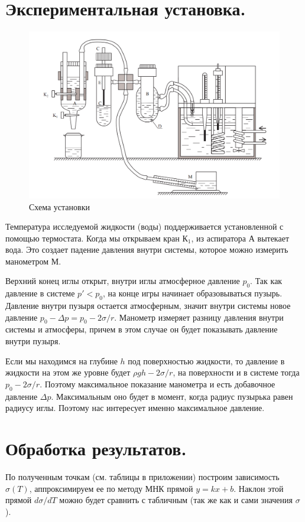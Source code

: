 \documentclass[a4paper,12pt]{report}
\begin{document}
\begin{multicols}{2}
        \section{Экспериментальная установка.}
        \begin{figure}[H]
            \centering
            \includegraphics[width=\columnwidth]{../img/ustanovka.png}
            \caption{Схема установки}
        \end{figure}
        Температура исследуемой жидкости (воды) поддерживается установленной с помощью термостата. Когда мы открываем кран К$_1$, из аспиратора А вытекает вода. Это создает падение давления внутри системы, которое можно измерить манометром М.

        Верхний конец иглы открыт, внутри иглы атмосферное давление $p_0$. Так как давление в системе $p'<p_0$, на конце игры начинает образовываться пузырь. Давление внутри пузыря остается атмосферным, значит внутри системы новое давление $p_0-\Delta p=p_0-2\sigma/r$. Манометр измеряет разницу давления внутри системы и атмосферы, причем в этом случае он будет показывать давление внутри пузыря.

        Если мы находимся на глубине $h$ под поверхностью жидкости, то давление в жидкости на этом же уровне будет $\rho g h -2\sigma/r$, на поверхности и в системе тогда $p_0-2\sigma/r$. Поэтому максимальное показание манометра и есть добавочное давление $\Delta p$. Максимальным оно будет в момент, когда радиус пузырька равен радиусу иглы. Поэтому нас интересует именно максимальное давление.
        \newcolumn
        \section{Обработка результатов.}
        По полученным точкам (см. таблицы в приложении) построим зависимость $\sigma(T)$, аппроксимируем ее по методу МНК прямой $y=kx+b$. Наклон этой прямой $d\sigma/dT$ можно будет сравнить с табличным (так же как и сами значения $\sigma$).


\end{multicols}
\end{document}
